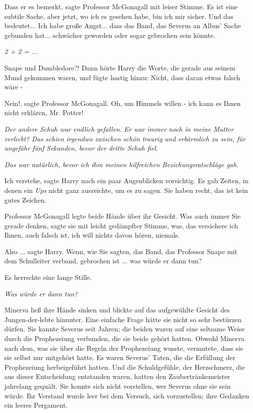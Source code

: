\glqq Dass er es bemerkt\grqq{}, sagte Professor McGonagall mit leiser Stimme.
\glqq Es ist eine subtile Sache, aber jetzt, wo ich es gesehen habe, bin ich mir
sicher. Und das bedeutet... Ich habe große Angst... dass das Band, das Severus
an Albus' Sache gebunden hat... schwächer geworden oder sogar gebrochen sein
könnte.\grqq{}

\emph{2 + 2 = ... }

\glqq Snape und Dumbledore?!\grqq{} Dann hörte Harry die Worte, die gerade aus
seinem Mund gekommen waren, und fügte hastig hinzu: \glqq Nicht, dass daran
etwas falsch wäre -\grqq{}

\glqq Nein!\grqq{}, sagte Professor McGonagall. \glqq Oh, um Himmels willen -
ich kann es Ihnen nicht erklären, Mr. Potter!\grqq{}

\emph{Der andere Schuh war endlich gefallen. }
\emph{Er war immer noch in meine Mutter verliebt? Das schien irgendwo zwischen schön traurig und erbärmlich zu sein, für ungefähr fünf Sekunden, bevor der dritte Schuh fiel. }

\emph{Das war natürlich, bevor ich ihm meinen hilfreichen Beziehungsratschläge gab.}

\glqq Ich verstehe\grqq{}, sagte Harry nach ein paar Augenblicken vorsichtig. Es
gab Zeiten, in denen ein \glqq \emph{Ups}\grqq{} nicht ganz ausreichte, um es zu
sagen. \glqq Sie haben recht, das ist kein gutes Zeichen.\grqq{}

Professor McGonagall legte beide Hände über ihr Gesicht. \glqq Was auch immer
Sie gerade denken\grqq{}, sagte sie mit leicht gedämpfter Stimme, \glqq was, das
versichere ich Ihnen, auch falsch ist, ich will nichts davon hören,
niemals.\grqq{}

\glqq Also ...\grqq{} sagte Harry. \glqq Wenn, wie Sie sagten, das Band, das
Professor Snape mit dem Schulleiter verband, gebrochen ist ... was würde er dann
tun?\grqq{}

Es herrschte eine lange Stille.

\emph{Was würde er dann tun? }

Minerva ließ ihre Hände sinken und blickte auf das aufgewühlte Gesicht des
Jungen-der-lebte hinunter. Eine einfache Frage hätte sie nicht so sehr bestürzen
dürfen. Sie kannte Severus seit Jahren; die beiden waren auf eine seltsame Weise
durch die Prophezeiung verbunden, die sie beide gehört hatten. Obwohl Minerva
nach dem, was sie über die Regeln der Prophezeiung wusste, vermutete, dass sie
sie selbst nur mitgehört hatte. Es waren Severus' Taten, die die Erfüllung der
Prophezeiung herbeigeführt hatten. Und die Schuldgefühle, der Herzschmerz, die
aus dieser Entscheidung entstanden waren, hatten den Zaubertränkemeister
jahrelang gequält. Sie konnte sich nicht vorstellen, wer Severus ohne sie sein
würde. Ihr Verstand wurde leer bei dem Versuch, sich vorzustellen; ihre Gedanken
ein leeres Pergament.

